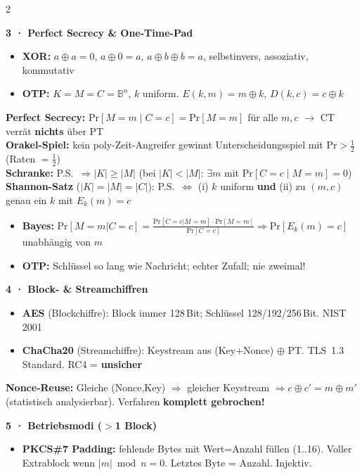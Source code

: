 \documentclass[11pt,a4paper]{article}
\newcommand{\h}[1]{%
  \vspace{3pt}%
  \noindent\colorbox{hdr2}{%
    \parbox{\dimexpr\linewidth-2\fboxsep}{\color{white}\bfseries #1}}%
  \par\vspace{1pt}%
}
\newenvironment{ibox}{\begin{mdframed}[style=infoS]}{\end{mdframed}}
\newenvironment{wbox}{\begin{mdframed}[style=warnS]}{\end{mdframed}}
\newcommand{\warn}[1]{{\color{warnred}\textbf{#1}}}
\newcommand{\xor}{\oplus}
\renewcommand{\Pr}{\mathrm{Pr}}
\begin{document}
\begin{multicols}{2}
\h{3 · Perfect Secrecy \& One-Time-Pad}
\begin{itemize}
\item \textbf{XOR:} $a\xor a=0$, $a\xor 0=a$, $a\xor b\xor b=a$,
  selbstinvers, assoziativ, kommutativ
\item \textbf{OTP:} $K=M=C=\mathbb{B}^n$, $k$ uniform.
  $E(k,m)=m\xor k$,\; $D(k,c)=c\xor k$
\end{itemize}
\begin{ibox}
\textbf{Perfect Secrecy:} $\Pr[M=m\mid C=c]=\Pr[M=m]$ für alle $m,c$
$\to$ CT verrät \textbf{nichts} über PT\\
\textbf{Orakel-Spiel:} kein poly-Zeit-Angreifer gewinnt Unterscheidungsspiel
mit $\Pr>\tfrac{1}{2}$ (Raten $=\tfrac{1}{2}$)\\
\textbf{Schranke:} P.S.\ $\Rightarrow |K|\ge|M|$
(bei $|K|<|M|$: $\exists m$ mit $\Pr[C=c\mid M=m]=0$)\\
\textbf{Shannon-Satz} ($|K|{=}|M|{=}|C|$): P.S.\ $\Leftrightarrow$
(i) $k$ uniform \textbf{und} (ii) zu $(m,c)$ genau ein $k$ mit $E_k(m)=c$
\end{ibox}
\begin{itemize}
\item \textbf{Bayes:}
  $\Pr[M{=}m|C{=}c]=\frac{\Pr[C{=}c|M{=}m]\cdot\Pr[M{=}m]}{\Pr[C{=}c]}
  \Rightarrow \Pr[E_k(m){=}c]$ unabhängig von $m$
\item \warn{OTP:} Schlüssel so lang wie Nachricht; echter Zufall; nie zweimal!
\end{itemize}

\h{4 · Block- \& Streamchiffren}
\begin{itemize}
\item \textbf{AES} (Blockchiffre): Block immer 128\,Bit;
  Schlüssel 128/192/256\,Bit. NIST 2001
\item \textbf{ChaCha20} (Streamchiffre): Keystream aus (Key+Nonce) $\xor$ PT.
  TLS~1.3 Standard. RC4 = \warn{unsicher}
\end{itemize}
\begin{wbox}
\textbf{Nonce-Reuse:} Gleiche (Nonce,Key) $\Rightarrow$ gleicher Keystream
$\Rightarrow c\xor c'=m\xor m'$ (statistisch analysierbar).
Verfahren \textbf{komplett gebrochen!}\\
\end{wbox}

\h{5 · Betriebsmodi ($>$1 Block)}
\begin{itemize}
\item \textbf{PKCS\#7 Padding:} fehlende Bytes mit Wert=Anzahl füllen (1..16).
  Voller Extrablock wenn $|m|\bmod n=0$. Letztes Byte = Anzahl. Injektiv.
\end{itemize}


\end{multicols}
\end{document}
